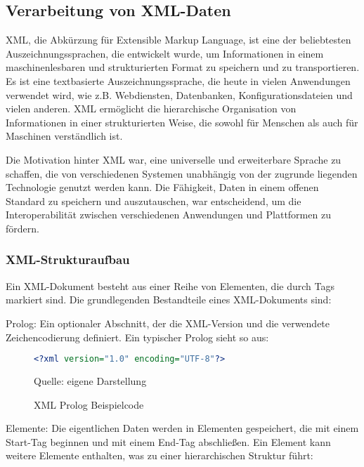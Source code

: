 \subsection{Verarbeitung von XML-Daten}

XML, die Abkürzung für Extensible Markup Language, ist eine der beliebtesten Auszeichnungssprachen, die entwickelt wurde,
um Informationen in einem maschinenlesbaren und strukturierten Format zu speichern und zu transportieren.
Es ist eine textbasierte Auszeichnungssprache, die heute in vielen Anwendungen verwendet wird, wie z.B. Webdiensten,
Datenbanken, Konfigurationsdateien und vielen anderen.
XML ermöglicht die hierarchische Organisation von Informationen in einer strukturierten Weise, die sowohl für Menschen
als auch für Maschinen verständlich ist.

Die Motivation hinter XML war, eine universelle und erweiterbare Sprache zu schaffen, die von verschiedenen Systemen
unabhängig von der zugrunde liegenden Technologie genutzt werden kann.
Die Fähigkeit, Daten in einem offenen Standard zu speichern und auszutauschen, war entscheidend,
um die Interoperabilität zwischen verschiedenen Anwendungen und Plattformen zu fördern.

\subsubsection{XML-Strukturaufbau}

Ein XML-Dokument besteht aus einer Reihe von Elementen, die durch Tags markiert sind.
Die grundlegenden Bestandteile eines XML-Dokuments sind:

Prolog: Ein optionaler Abschnitt, der die XML-Version und die verwendete Zeichencodierung definiert.
Ein typischer Prolog sieht so aus:

\begin{figure}[H]
\centering
\begin{minipage}{0.95\textwidth}
\begin{lstlisting}[language=XML]
<?xml version="1.0" encoding="UTF-8"?>
\end{lstlisting}
\end{minipage}
\caption{XML Prolog Beispielcode}
\label{fig:XML Prolog Beispielcode}
    {Quelle: eigene Darstellung}
\end{figure}

Elemente: Die eigentlichen Daten werden in Elementen gespeichert, die mit einem Start-Tag beginnen und mit einem End-Tag abschließen.
Ein Element kann weitere Elemente enthalten, was zu einer hierarchischen Struktur führt:

